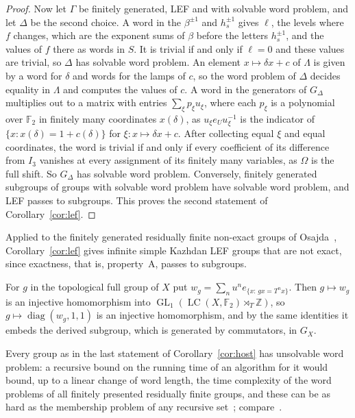 \documentclass[11pt]{amsart}
\newcommand{\F}{\mathbb F}
\newcommand{\Z}{\mathbb Z}
\newcommand{\LC}{\operatorname{LC}}
\newcommand{\GL}{\operatorname{GL}}
\begin{document}
\begin{proof}
Now let $\Gamma$ be finitely generated, LEF and with solvable word
problem, and let $\Delta$ be the second choice. A word in the
$\beta^{\pm1}$ and $h_s^{\pm1}$ gives $\ell$, the levels where $f$
changes, which are the exponent sums of $\beta$ before the letters
$h_s^{\pm1}$, and the values of $f$ there as words in $S$. It is trivial
if and only if $\ell=0$ and these values are trivial, so $\Delta$ has
solvable word problem. An element $x\mapsto\delta x+c$ of $\Lambda$ is
given by a word for $\delta$ and words for the lamps of $c$, so the word
problem of $\Delta$ decides equality in $\Lambda$ and computes the values
of $c$. A word in the generators of $G_\Delta$ multiplies out to a matrix
with entries $\sum_\xi p_\xi u_\xi$, where each $p_\xi$ is a polynomial
over $\F_2$ in finitely many coordinates $x(\delta)$, as
$u_\xi e_Uu_\xi^{-1}$ is the indicator of $\{x:x(\delta)=1+c(\delta)\}$ for
$\xi\colon x\mapsto\delta x+c$. After collecting equal $\xi$ and equal
coordinates, the word is trivial if and only if every coefficient of its
difference from $I_3$ vanishes at every assignment of its finitely many
variables, as $\Omega$ is the full shift. So $G_\Delta$ has solvable word
problem. Conversely, finitely generated subgroups of groups with solvable
word problem have solvable word problem, and LEF passes to subgroups.
This proves the second statement of Corollary~\ref{cor:lef}.
\end{proof}

Applied to the finitely generated residually finite non-exact groups of
Osajda~\cite{OsajdaRF}, Corollary~\ref{cor:lef} gives infinite simple
Kazhdan LEF groups that are not exact, since exactness, that is,
property~A, passes to subgroups.

For $g$ in the topological full group of $X$ put
$w_g=\sum_nu^ne_{\{x:\,gx=T^nx\}}$. Then $g\mapsto w_g$ is an injective
homomorphism into $\GL_1(\LC(X,\F_2)\rtimes_T\Z)$, so
$g\mapsto\operatorname{diag}(w_g,1,1)$ is an injective homomorphism, and by
the same identities it embeds the derived subgroup, which is generated by
commutators, in $G_X$.

Every group as in the last statement of Corollary~\ref{cor:host} has
unsolvable word problem: a
recursive bound on the running time of an algorithm for it would bound,
up to a linear change of word length, the time complexity of the word
problems of all finitely presented residually finite groups, and these
can be as hard as the membership problem of any recursive
set~\cite[Theorem~4.21]{KMS}; compare~\cite[Proposition~26 and the proof of
Lemma~27]{Rauzy}.
\end{document}
